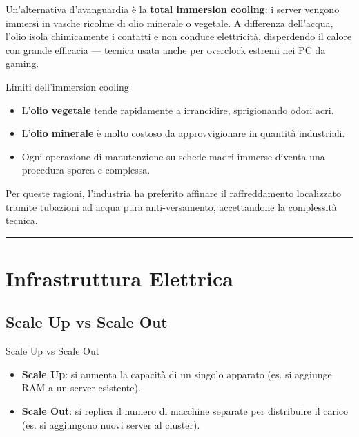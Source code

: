 \documentclass[
  italian,
  openany]{book}
\providecommand{\tightlist}{%
  \setlength{\itemsep}{0pt}\setlength{\parskip}{0pt}}
\begin{document}
Un'alternativa d'avanguardia è la \textbf{total immersion cooling}: i
server vengono immersi in vasche ricolme di olio minerale o vegetale. A
differenza dell'acqua, l'olio isola chimicamente i contatti e non
conduce elettricità, disperdendo il calore con grande efficacia ---
tecnica usata anche per overclock estremi nei PC da gaming.

\begin{calloutnote}{Limiti dell’immersion cooling}

\begin{itemize}
\tightlist
\item
  L'\textbf{olio vegetale} tende rapidamente a irrancidire, sprigionando
  odori acri.
\item
  L'\textbf{olio minerale} è molto costoso da approvvigionare in
  quantità industriali.
\item
  Ogni operazione di manutenzione su schede madri immerse diventa una
  procedura sporca e complessa.
\end{itemize}

Per queste ragioni, l'industria ha preferito affinare il raffreddamento
localizzato tramite tubazioni ad acqua pura anti-versamento,
accettandone la complessità tecnica.

\end{calloutnote}

\begin{center}\rule{0.5\linewidth}{0.5pt}\end{center}

\section{Infrastruttura Elettrica}\label{infrastruttura-elettrica-1}

\subsection{Scale Up vs Scale Out}\label{scale-up-vs-scale-out}

\begin{calloutdefinition}{Scale Up vs Scale Out}

\begin{itemize}
\tightlist
\item
  \textbf{Scale Up}: si aumenta la capacità di un singolo apparato (es.
  si aggiunge RAM a un server esistente).
\item
  \textbf{Scale Out}: si replica il numero di macchine separate per
  distribuire il carico (es. si aggiungono nuovi server al cluster).
\end{itemize}

\end{calloutdefinition}
\end{document}
